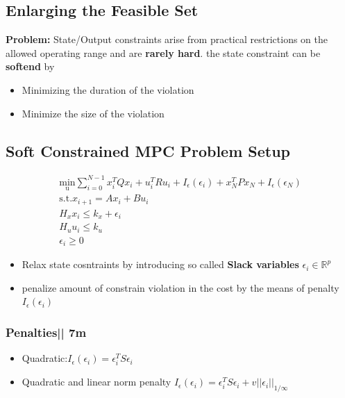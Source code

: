 \subsection{Enlarging the Feasible Set}
\textbf{Problem:} State/Output constraints arise from practical restrictions on the allowed operating range and are \textbf{rarely hard}. the state constraint can be \textbf{softend} by 
\begin{itemize}
    \item Minimizing the duration of the violation
    \item Minimize the size of the violation
\end{itemize}
\subsection{Soft Constrained MPC Problem Setup}
\begin{gather*}
    \underset{\mathrm{u}}{\mathrm{min}}\sum^{N-1}_{i=0}x_i^T Q x_i + u_i^T R u_i + I_\epsilon(\epsilon_i) + x_N^T P x_N+ I_\epsilon(\epsilon_N)\\
    \mathrm{s.t.} x_{i+1} = Ax_i+ Bu_i\\
    H_x x_i \leq k_x + \epsilon_i\\
    H_u u_i\leq k_u\\
    \epsilon_i\geq 0
\end{gather*}
\begin{itemize}
    \item Relax state cosntraints by introducing so called \textbf{Slack variables} $\epsilon_i \in \mathbb{R}^p$
    \item penalize amount of constrain violation in the cost by the means of penalty $I_\epsilon(\epsilon_i)$
\end{itemize}
\subsubsection{Penalties|| 7m}
\begin{itemize}
    \item Quadratic:$I_\epsilon(\epsilon_i) = \epsilon_i^T S \epsilon_i$
    \item Quadratic and linear norm penalty $I_\epsilon(\epsilon_i) = \epsilon_i^TS\epsilon_i+v||\epsilon_i||_{1/\infty}$
\end{itemize}

